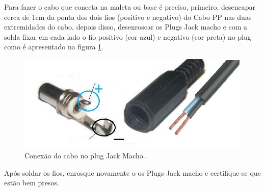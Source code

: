 Para fazer o cabo que conecta na maleta ou base é preciso, primeiro, desencapar cerca de 1cm da ponta dos dois fios (positivo e negativo) do Cabo PP nas duas extremidades do cabo, depois disso, desenroscar os Plugs Jack macho e com a solda fixar em cada lado o fio positivo (cor azul) e negativo (cor preta) no plug como é apresentado na figura \ref{conexao_jack}.


\begin{figure}[H]
  \centering
  \includegraphics[width=\textwidth]{Figuras/Carregador/conexao_jack.JPG}
  \caption{Conexão do cabo no plug Jack Macho..} 
  \label{conexao_jack}
\end{figure}

Após soldar os fios, enrosque novamente o os Plugs Jack macho e certifique-se que estão bem presos. 